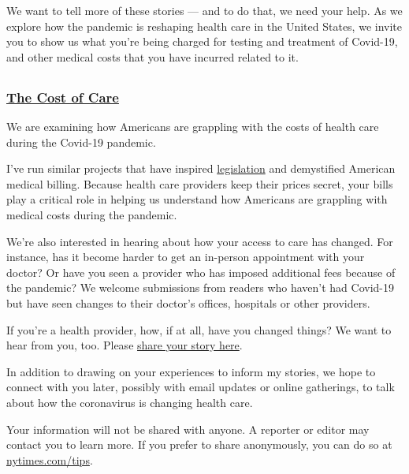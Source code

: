 We want to tell more of these stories --- and to do that, we need your
help. As we explore how the pandemic is reshaping health care in the
United States, we invite you to show us what you're being charged for
testing and treatment of Covid-19, and other medical costs that you have
incurred related to it.

\subsection{}

\hypertarget{the-cost-of-care}{%
\subsubsection{\texorpdfstring{\href{https://www.nytimes.com/spotlight/new-york-shuttered}{The
Cost of Care}}{The Cost of Care}}\label{the-cost-of-care}}

We are examining how Americans are grappling with the costs of health
care during the Covid-19 pandemic.

I've run similar projects that have inspired
\href{https://www.vox.com/2019/4/24/18514240/california-surprise-er-bills-zuckerberg}{legislation}
and demystified American medical billing. Because health care providers
keep their prices secret, your bills play a critical role in helping us
understand how Americans are grappling with medical costs during the
pandemic.

We're also interested in hearing about how your access to care has
changed. For instance, has it become harder to get an in-person
appointment with your doctor? Or have you seen a provider who has
imposed additional fees because of the pandemic? We welcome submissions
from readers who haven't had Covid-19 but have seen changes to their
doctor's offices, hospitals or other providers.

If you're a health provider, how, if at all, have you changed things? We
want to hear from you, too. Please
\href{https://www.nytimes.com/2020/08/03/reader-center/healthcare-workers-coronavirus-care.html}{share
your story here}.

In addition to drawing on your experiences to inform my stories, we hope
to connect with you later, possibly with email updates or online
gatherings, to talk about how the coronavirus is changing health care.

Your information will not be shared with anyone. A reporter or editor
may contact you to learn more. If you prefer to share anonymously, you
can do so at \href{https://www.nytimes.com/tips}{nytimes.com/tips}.

